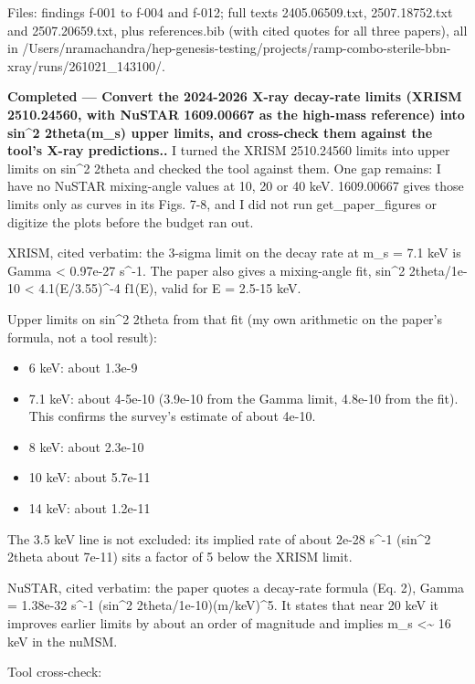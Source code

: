 \documentclass[11pt,a4paper]{article}
\begin{document}
Files: findings f-001 to f-004 and f-012; full texts 2405.06509.txt, 2507.18752.txt and 2507.20659.txt, plus references.bib (with cited quotes for all three papers), all in /Users/nramachandra/hep-genesis-testing/projects/ramp-combo-sterile-bbn-xray/runs/261021\_143100/.

\textbf{Completed --- Convert the 2024-2026 X-ray decay-rate limits (XRISM 2510.24560, with NuSTAR 1609.00667 as the high-mass reference) into sin\textasciicircum{}2 2theta(m\_s) upper limits, and cross-check them against the tool's X-ray predictions..} I turned the XRISM 2510.24560 limits into upper limits on sin\textasciicircum{}2 2theta and checked the tool against them. One gap remains: I have no NuSTAR mixing-angle values at 10, 20 or 40 keV. 1609.00667 gives those limits only as curves in its Figs. 7-8, and I did not run get\_paper\_figures or digitize the plots before the budget ran out.

XRISM, cited verbatim: the 3-sigma limit on the decay rate at m\_s = 7.1 keV is Gamma \textless{} 0.97e-27 s\textasciicircum{}-1. The paper also gives a mixing-angle fit, sin\textasciicircum{}2 2theta/1e-10 \textless{} 4.1(E/3.55)\textasciicircum{}-4 f1(E), valid for E = 2.5-15 keV.

Upper limits on sin\textasciicircum{}2 2theta from that fit (my own arithmetic on the paper's formula, not a tool result):

\begin{itemize}
  \item 6 keV: about 1.3e-9
  \item 7.1 keV: about 4-5e-10 (3.9e-10 from the Gamma limit, 4.8e-10 from the fit). This confirms the survey's estimate of about 4e-10.
  \item 8 keV: about 2.3e-10
  \item 10 keV: about 5.7e-11
  \item 14 keV: about 1.2e-11
\end{itemize}
The 3.5 keV line is not excluded: its implied rate of about 2e-28 s\textasciicircum{}-1 (sin\textasciicircum{}2 2theta about 7e-11) sits a factor of 5 below the XRISM limit.

NuSTAR, cited verbatim: the paper quotes a decay-rate formula (Eq. 2), Gamma = 1.38e-32 s\textasciicircum{}-1 (sin\textasciicircum{}2 2theta/1e-10)(m/keV)\textasciicircum{}5. It states that near 20 keV it improves earlier limits by about an order of magnitude and implies m\_s \textless{}\textasciitilde{} 16 keV in the nuMSM.

Tool cross-check:
\end{document}
